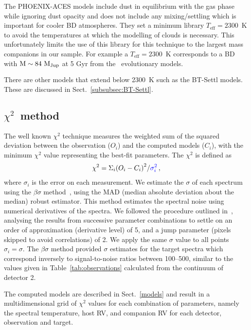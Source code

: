 \documentclass[fleqn,usenatbib]{mnras}
\newcommand*\bl{\color{blue}}
\begin{document}
The PHOENIX-ACES models include dust in equilibrium with the gas phase while ignoring dust opacity and does not include any mixing/settling which is important for cooler BD atmospheres. They set a minimum library \(T_{\textrm{eff}}=2300\)~K to avoid the temperatures at which the modelling of clouds is necessary. This unfortunately limits the use of this library for this technique to the largest mass companions in our sample. For example a \(T_{\textrm{eff}}=2300\)~K corresponds to a BD with \(\rm M\sim84~M_{Jup}\) at 5 Gyr from the~\citet{baraffe_evolutionary_2003} evolutionary models.

There are other models that extend below 2300~K such as the {BT-Settl} models\citep{allard_btsettl_2013,baraffe_new_2015}. These are discussed in Sect.~\ref{subsubsec:BT-Settl}.

\subsection{\texorpdfstring{\(\chi^{2}\)}\ \ method}
\label{subsec:chi2}
The well known \(\chi^{2}\) technique measures the weighted sum of the squared deviation between the observation (\({O}_{i}\)) and the computed models (\(C_{i}\)), with the minimum \(\chi^2\) value representing the best-fit parameters. The \(\chi^{2}\) is defined as
\begin{equation}
\chi^{2} = {\Sigma}_i { (O_{i} - C_{i})}^2 / {\bl {\sigma}_{i}^{2}}\,,
\end{equation}
  where \({\sigma}_{i}\) is the error on each measurement. We estimate the \(\sigma\) of each spectrum using the \(\beta\sigma\) method~\citep{czesla_posteriori_2018}, using the MAD (median absolute deviation about the median) robust estimator. {This method estimates the spectral noise using numerical derivatives of the spectra. We followed the procedure outlined in~\citet{czesla_posteriori_2018}, analysing the results from successive parameter combinations to settle on an order of approximation (derivative level) of 5, and a jump parameter (pixels skipped to avoid correlations) of 2.} We apply the same \(\sigma\) value to all points \({\sigma}_{i} = \sigma\). The \(\beta\sigma\) method provided \(\sigma\) estimates for the target spectra which correspond inversely to signal-to-noise ratios between 100--500, {similar to the values given in Table~\ref{tab:observations} calculated from the continuum of detector 2.}

The computed models are described in Sect.~\ref{models} and result in a multidimensional grid of \(\chi^2\) values for each combination of parameters, namely the spectral temperature, host RV, and companion RV for each detector, observation and target.
\end{document}

